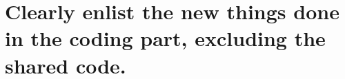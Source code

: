 \documentclass{article}
\begin{document}

\section{Clearly enlist the new things done in the coding part, excluding the shared code.}
\end{document}
